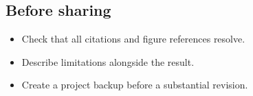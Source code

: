 \documentclass[11pt,a4paper]{article}
\begin{document}
\subsection{Before sharing}
\begin{itemize}
\item Check that all citations and figure references resolve.
\item Describe limitations alongside the result.
\item Create a project backup before a substantial revision.
\end{itemize}


\end{document}
